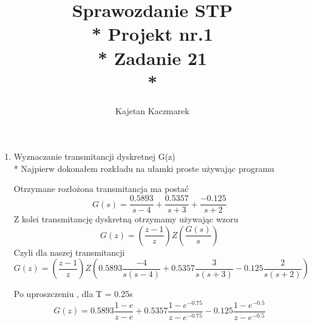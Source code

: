 \documentclass[a4paper, 11pt]{article}
\author{Kajetan Kaczmarek}
\begin{document}
\title{Sprawozdanie STP \\* Projekt nr.1 \\* 
Zadanie 21 \\*}
\maketitle

\begin{enumerate}
\item Wyznaczanie transmitancji dyskretnej G(z) \\*
Najpierw dokonałem rozkładu na ułamki proste używając programu



Otrzymane rozłożona transmitancja ma postać \[ G(s) = \dfrac{0.5893}{s-4} + \dfrac{0.5357}{s+3} +\dfrac{-0.125}{s+2} \]
Z kolei transmitancję dyskretną otrzymamy używając wzoru \[G(z) = (\dfrac{z-1}{z})Z(\dfrac{G(s)}{s}) \] Czyli dla naszej transmitancji
 \[G(z) = (\dfrac{z-1}{z})Z(0.5893\dfrac{-4}{s(s - 4)} + 0.5357\dfrac{3}{s(s + 3)} - 0.125\dfrac{2}{s(s + 2)} ) \] 
 
 Po uproszczeniu , dla T = 0.25s
  \[G(z) = 0.5893\dfrac{1-e}{z - e} + 0.5357\dfrac{1-e^{-0.75}}{z - e^{-0.75}} - 0.125\dfrac{1-e^{-0.5}}{z - e^{-0.5}}  \] 


\end{enumerate}
\end{document}
